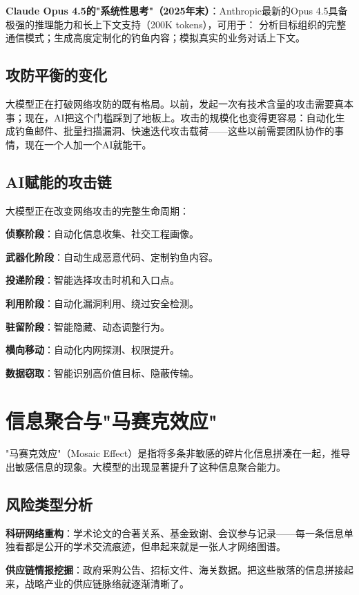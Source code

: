 \textbf{Claude Opus 4.5的"系统性思考"（2025年末）}：Anthropic最新的Opus 4.5具备极强的推理能力和长上下文支持（200K tokens），可用于：
分析目标组织的完整通信模式；生成高度定制化的钓鱼内容；模拟真实的业务对话上下文。

\subsection{攻防平衡的变化}

大模型正在打破网络攻防的既有格局。以前，发起一次有技术含量的攻击需要真本事；现在，AI把这个门槛踩到了地板上。攻击的规模化也变得更容易：自动化生成钓鱼邮件、批量扫描漏洞、快速迭代攻击载荷——这些以前需要团队协作的事情，现在一个人加一个AI就能干。

\subsection{AI赋能的攻击链}

大模型正在改变网络攻击的完整生命周期：

\textbf{侦察阶段}：自动化信息收集、社交工程画像。

\textbf{武器化阶段}：自动生成恶意代码、定制钓鱼内容。

\textbf{投递阶段}：智能选择攻击时机和入口点。

\textbf{利用阶段}：自动化漏洞利用、绕过安全检测。

\textbf{驻留阶段}：智能隐藏、动态调整行为。

\textbf{横向移动}：自动化内网探测、权限提升。

\textbf{数据窃取}：智能识别高价值目标、隐蔽传输。

\section{信息聚合与"马赛克效应"}

"马赛克效应"（Mosaic Effect）是指将多条非敏感的碎片化信息拼凑在一起，推导出敏感信息的现象。大模型的出现显著提升了这种信息聚合能力。

\subsection{风险类型分析}

\textbf{科研网络重构}：学术论文的合著关系、基金致谢、会议参与记录——每一条信息单独看都是公开的学术交流痕迹，但串起来就是一张人才网络图谱。

\textbf{供应链情报挖掘}：政府采购公告、招标文件、海关数据。把这些散落的信息拼接起来，战略产业的供应链脉络就逐渐清晰了。

